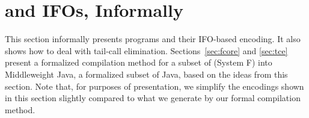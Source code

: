 

\section{\name and IFOs, Informally}\label{sec:overview}

This section informally presents \name programs and their IFO-based
encoding. It also shows how to deal with tail-call elimination.
Sections~\ref{sec:fcore} and \ref{sec:tce} present a formalized
compilation method for a subset of \name (System F) into Middleweight Java, 
a formalized subset of Java, based on the ideas from this section.
Note that, for purposes of presentation, we simplify the encodings shown in this
section slightly compared to what we generate by our formal compilation
method.


\begin{comment}
\subsection{Imperative Functional Objects}

\begin{figure}[t]

\begin{lstlisting}
def tfact : Int => Int => Int = acc => n => 
  if (n == 0) acc else tfact(acc*n)(n-1)

def even : Int => Boolean = n =>
    if (n == 0) true else odd(n-1)
    
def odd : Int => Boolean = n =>
    if (n == 0) false else even(n-1)
\end{lstlisting}

\caption{Scala function definitions for computing factorial, even and odd.}

\label{fig:scala_defs}

\end{figure}

Currently, functional programming in the JVM requires some compromises, especially 
when performance or memory are primary considerations. For example, consider the 
Scala functions in Figure~\ref{fig:scala_defs}.
The function \lstinline{tfact} computes the factorial of some number
\lstinline{n} using a standard tail-recursive implementation with an accumulator.  The
functions \lstinline{even} and \lstinline{odd} define a naive
algorithm for detecting whether a number is even or
odd. We define the later two functions using \emph{mutually recursive tail calls}. 
The code uses Scala first-class functions (\lstinline{A => B}), represented by the following trait:


\end{comment}
